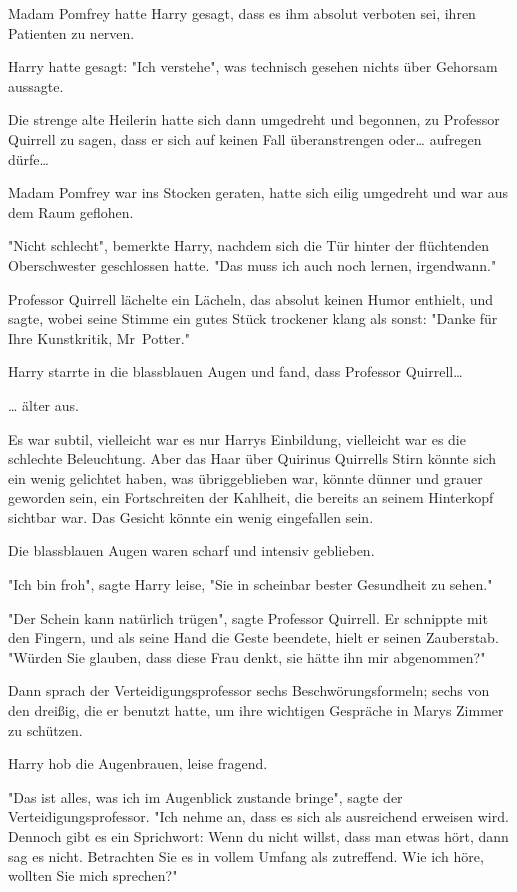 {Madam Pomfrey hatte Harry gesagt, dass es ihm absolut verboten sei, ihren Patienten zu nerven.

Harry hatte gesagt: "Ich verstehe", was technisch gesehen nichts über Gehorsam aussagte.

Die strenge alte Heilerin hatte sich dann umgedreht und begonnen, zu Professor Quirrell zu sagen, dass er sich auf keinen Fall überanstrengen oder… aufregen dürfe…

Madam Pomfrey war ins Stocken geraten, hatte sich eilig umgedreht und war aus dem Raum geflohen.

"Nicht schlecht", bemerkte Harry, nachdem sich die Tür hinter der flüchtenden Oberschwester geschlossen hatte. "Das muss ich auch noch lernen, irgendwann."

Professor Quirrell lächelte ein Lächeln, das absolut keinen Humor enthielt, und sagte, wobei seine Stimme ein gutes Stück trockener klang als sonst: "Danke für Ihre Kunstkritik, Mr~Potter."

Harry starrte in die blassblauen Augen und fand, dass Professor Quirrell…

… älter aus.

Es war subtil, vielleicht war es nur Harrys Einbildung, vielleicht war es die schlechte Beleuchtung. Aber das Haar über Quirinus Quirrells Stirn könnte sich ein wenig gelichtet haben, was übriggeblieben war, könnte dünner und grauer geworden sein, ein Fortschreiten der Kahlheit, die bereits an seinem Hinterkopf sichtbar war. Das Gesicht könnte ein wenig eingefallen sein.

Die blassblauen Augen waren scharf und intensiv geblieben.

"Ich bin froh", sagte Harry leise, "Sie in scheinbar bester Gesundheit zu sehen."

"Der Schein kann natürlich trügen", sagte Professor Quirrell. Er schnippte mit den Fingern, und als seine Hand die Geste beendete, hielt er seinen Zauberstab. "Würden Sie glauben, dass diese Frau denkt, sie hätte ihn mir abgenommen?"

Dann sprach der Verteidigungsprofessor sechs Beschwörungsformeln; sechs von den dreißig, die er benutzt hatte, um ihre wichtigen Gespräche in Marys Zimmer zu schützen.

Harry hob die Augenbrauen, leise fragend.

"Das ist alles, was ich im Augenblick zustande bringe", sagte der Verteidigungsprofessor. "Ich nehme an, dass es sich als ausreichend erweisen wird. Dennoch gibt es ein Sprichwort: Wenn du nicht willst, dass man etwas hört, dann sag es nicht. Betrachten Sie es in vollem Umfang als zutreffend. Wie ich höre, wollten Sie mich sprechen?"

}
